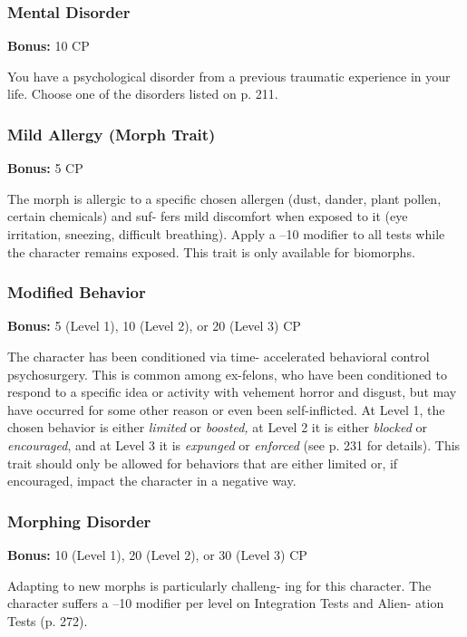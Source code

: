 \subsubsection{Mental Disorder}

\textbf{Bonus:} 10 CP

You have a psychological disorder from a previous 
traumatic experience in your life. Choose one of the 
disorders listed on p. 211.

\subsubsection{Mild Allergy (Morph Trait)}

\textbf{Bonus:} 5 CP

The morph is allergic to a specific chosen allergen 
(dust, dander, plant pollen, certain chemicals) and suf-
fers mild discomfort when exposed to it (eye irritation, 
sneezing, difficult breathing). Apply a –10 modifier to 
all tests while the character remains exposed. This 
trait is only available for biomorphs.

\subsubsection{Modified Behavior}

\textbf{Bonus: }5 (Level 1), 10 (Level 2), or 20 (Level 3) CP

The character has been conditioned via time-
accelerated behavioral control psychosurgery. This is 
common among ex-felons, who have been conditioned 
to respond to a specific idea or activity with vehement 
horror and disgust, but may have occurred for some 
other reason or even been self-inflicted. At Level 1, the 
chosen behavior is either \textit{limited} or \textit{boosted,} at Level 
2 it is either \textit{blocked }or \textit{encouraged}, and at Level 3 it 
is \textit{expunged }or \textit{enforced }(see p. 231 for details). This 
trait should only be allowed for behaviors that are 
either limited or, if encouraged, impact the character 
in a negative way.

\subsubsection{Morphing Disorder}

\textbf{Bonus:} 10 (Level 1), 20 (Level 2), or 30 (Level 3) CP

Adapting to new morphs is particularly challeng-
ing for this character. The character suffers a –10 
modifier per level on Integration Tests and Alien-
ation Tests (p. 272).

